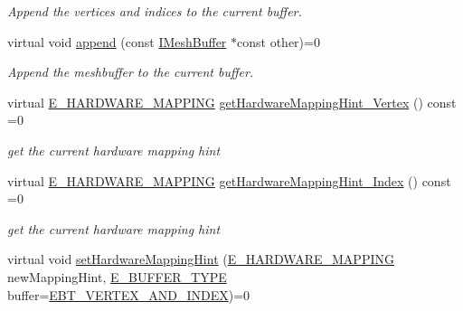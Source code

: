 \begin{DoxyCompactItemize}
\begin{DoxyCompactList}\small\item\em Append the vertices and indices to the current buffer. \end{DoxyCompactList}\item 
virtual void \hyperlink{classirr_1_1scene_1_1IMeshBuffer_a79d2737962579138183ed0fd324310b3}{append} (const \hyperlink{classirr_1_1scene_1_1IMeshBuffer}{I\+Mesh\+Buffer} $\ast$const other)=0
\begin{DoxyCompactList}\small\item\em Append the meshbuffer to the current buffer. \end{DoxyCompactList}\item 
\mbox{\label{classirr_1_1scene_1_1IMeshBuffer_abbf42191b2fb4d2f7094a77fd76a530e}} 
virtual \hyperlink{namespaceirr_1_1scene_ac7d8ee8d77da75f2580bb9bb17231c27}{E\+\_\+\+H\+A\+R\+D\+W\+A\+R\+E\+\_\+\+M\+A\+P\+P\+I\+NG} \hyperlink{classirr_1_1scene_1_1IMeshBuffer_abbf42191b2fb4d2f7094a77fd76a530e}{get\+Hardware\+Mapping\+Hint\+\_\+\+Vertex} () const =0
\begin{DoxyCompactList}\small\item\em get the current hardware mapping hint \end{DoxyCompactList}\item 
\mbox{\label{classirr_1_1scene_1_1IMeshBuffer_a2260f9efb3fad4ba9581e18fccaad5a7}} 
virtual \hyperlink{namespaceirr_1_1scene_ac7d8ee8d77da75f2580bb9bb17231c27}{E\+\_\+\+H\+A\+R\+D\+W\+A\+R\+E\+\_\+\+M\+A\+P\+P\+I\+NG} \hyperlink{classirr_1_1scene_1_1IMeshBuffer_a2260f9efb3fad4ba9581e18fccaad5a7}{get\+Hardware\+Mapping\+Hint\+\_\+\+Index} () const =0
\begin{DoxyCompactList}\small\item\em get the current hardware mapping hint \end{DoxyCompactList}\item 
\mbox{\label{classirr_1_1scene_1_1IMeshBuffer_a133c2ee78c14db43e0fec3d3e300700a}} 
virtual void \hyperlink{classirr_1_1scene_1_1IMeshBuffer_a133c2ee78c14db43e0fec3d3e300700a}{set\+Hardware\+Mapping\+Hint} (\hyperlink{namespaceirr_1_1scene_ac7d8ee8d77da75f2580bb9bb17231c27}{E\+\_\+\+H\+A\+R\+D\+W\+A\+R\+E\+\_\+\+M\+A\+P\+P\+I\+NG} new\+Mapping\+Hint, \hyperlink{namespaceirr_1_1scene_a8f59a89ffef0ad8e5b2c2cb874a93e8c}{E\+\_\+\+B\+U\+F\+F\+E\+R\+\_\+\+T\+Y\+PE} buffer=\hyperlink{namespaceirr_1_1scene_a8f59a89ffef0ad8e5b2c2cb874a93e8ca833624730c30cffccc121fe31aa0832c}{E\+B\+T\+\_\+\+V\+E\+R\+T\+E\+X\+\_\+\+A\+N\+D\+\_\+\+I\+N\+D\+EX})=0

\end{DoxyCompactItemize}
